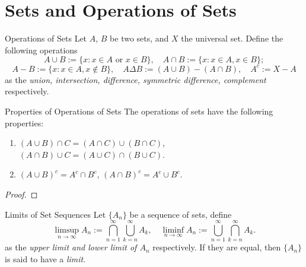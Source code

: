 
\section{Sets and Operations of Sets}

\begin{definition}{Operations of Sets}{}
  Let $A$, $B$ be two sets,
  and $X$ the universal set.
  Define the following operations
  \begin{equation}
    A \cup B := \{x: x \in A \text{ or } x \in B\}, \quad
    A \cap B := \{x: x \in A, x \in B\};
  \end{equation}
  \begin{equation}
    A - B := \{x: x \in A, x \not\in B\}, \quad
    A \Delta B := (A \cup B) - (A \cap B), \quad
    A^c := X - A
  \end{equation}
  as the \emph{union, intersection, difference, symmetric difference, complement} respectively.
\end{definition}

\begin{proposition}{Properties of Operations of Sets}{}
  The operations of sets have the following properties:
  \begin{enumerate}
  \item $(A \cup B)\cap C = (A \cap C) \cup (B \cap C)$,
    $(A \cap B) \cup C = (A \cup C) \cap (B \cup C)$.
  \item $(A\cup B)^c = A^c \cap B^c$, $(A \cap B)^c = A^c \cup B^c$.
  \end{enumerate}
\end{proposition}

\begin{proof}
  
\end{proof}

\begin{definition}{Limits of Set Sequences}{}
  Let $\{A_n\}$ be a sequence of sets,
  define
  \begin{equation}
    \limsup \limits_{n \rightarrow \infty} A_n := \bigcap \limits_{n = 1}^{\infty}
    \bigcup \limits_{k = n} ^{\infty} A_k, \quad
    \liminf \limits_{n \rightarrow \infty} A_n := \bigcup \limits_{n = 1}^{\infty}
    \bigcap \limits_{k = n}^{\infty}A_k.
  \end{equation}
  as the \emph{upper limit and lower limit of $A_n$} respectively.
  If they are equal, then $\{A_n\}$ is said to have a \emph{limit}.
\end{definition}

